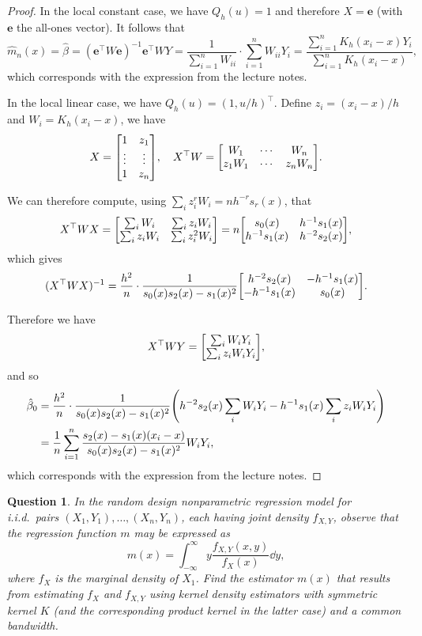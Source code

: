 \documentclass{article}
\theoremstyle{plain}
\newtheorem{question}{Question}
\theoremstyle{remark}
\renewcommand{\vec}{\boldsymbol}
\newcommand{\T}{^\top} %
\begin{document}
\begin{proof}
	In the local constant case, we have $Q_h(u) = 1$ and therefore $X = \vec e$ (with $\vec e$ the all-ones vector).
	It follows that 
	\[
	\hat m_n(x) = \hat\beta = (\vec e\T W \vec e)^{-1} \vec e\T WY = \frac1{\sum_{i=1}^n W_{ii}} \cdot \sum_{i=1}^n W_{ii} Y_i = \frac{\sum_{i=1}^n K_h(x_i - x)Y_i}{\sum_{i=1}^n K_h(x_i - x)},
	\]
	which corresponds with the expression from the lecture notes. 
		
	In the local linear case, we have $Q_h(u) = (1, u/h)\T$. Define $z_i = (x_i - x) / h$ and $W_i = K_h(x_i - x)$, we have
	\[
	X = \mqty[ 1 & z_1 \\ \vdots & \vdots \\ 1 & z_n], \quad X\T W = \mqty[ W_1 & \dotsb & W_n \\ z_1 W_1 & \dotsb & z_n W_n]. 
	\]
	
	We can therefore compute, using $\sum_i z_i^r W_i = n h^{-r} s_r(x)$, that 
	\[
	X\T W X = \mqty[ \sum_i W_i & \sum_i z_i W_i \\ \sum_i z_i W_i & \sum_i z_i^2 W_i] = n\mqty[ s_0(x) & h^{-1} s_1(x) \\
	h^{-1} s_1(x) & h^{-2} s_2(x)],
	\]
	which gives
	\[
	(X\T W X)^{-1} = \frac{h^2}{n}\cdot \frac1{s_0(x) s_2(x) - s_1(x)^2} \mqty[h^{-2} s_2(x) & - h^{-1} s_1(x) \\ -h^{-1} s_1(x) & s_0(x)].
	\]
	
	Therefore we have
	\[
	X\T W Y = \mqty[ \sum_i W_i Y_i \\ \sum_i z_i W_i Y_i],
	\]
	and so
	\begin{align*}
	\hat\beta_0 &= 
	\frac{h^2}{n}\cdot \frac1{s_0(x) s_2(x) - s_1(x)^2} \qty(h^{-2} s_2(x) \sum_i W_i Y_i - h^{-1} s_1(x) \sum_i z_i W_i Y_i)\\
	&= \frac1n \sum_{i=1}^n \frac{s_2(x) - s_1(x) (x_i - x)}{s_0(x) s_2(x) - s_1(x)^2} W_i Y_i, 
	\end{align*}
	which corresponds with the expression from the lecture notes. 
\end{proof}

\begin{question}
	In the random design nonparametric regression model for i.i.d.\ pairs $(X_1, Y_1), \dotsc, (X_n, Y_n)$, each having joint density $f_{X, Y}$, observe that the regression function $m$ may be expressed as
	\[
	m(x) = \int_{-\infty}^\infty y \frac{f_{X, Y}(x, y)}{f_X(x)} \dd{y}, 
	\]
	where $f_X$ is the marginal density of $X_1$. Find the estimator $m(x)$ that results from estimating $f_X$ and $f_{X, Y}$ using kernel density estimators with symmetric kernel $K$ (and the corresponding product kernel in the latter case) and a common bandwidth.
\end{question}
\end{document}

